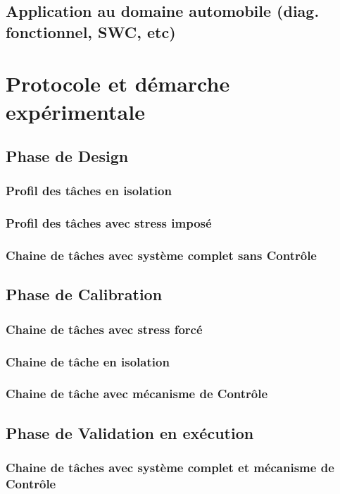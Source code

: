 \documentclass[french, a4paper, 11pt, twoside]{StyleThese}
\begin{document}
    \section{Application au domaine  automobile (diag. fonctionnel, SWC, etc)}
\chapter{Protocole et démarche expérimentale}
        \section{Phase de Design}
            \subsection{Profil des tâches en isolation}
            \subsection{Profil des tâches avec stress imposé}
            \subsection{Chaine de tâches avec système complet sans Contrôle}
        \section{Phase de Calibration}
            \subsection{Chaine de tâches avec stress forcé}
            \subsection{Chaine de tâche en isolation}
            \subsection{Chaine de tâche avec mécanisme de Contrôle}
        \section{Phase de Validation en exécution}
            \subsection{Chaine de tâches avec système complet et mécanisme de Contrôle}
\end{document}
